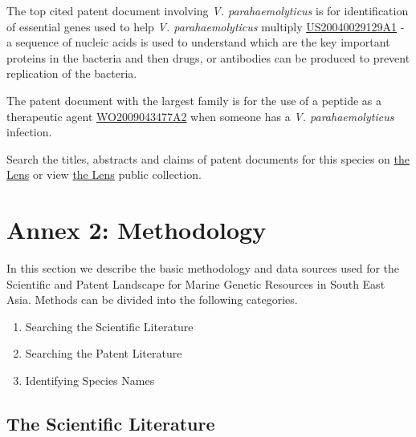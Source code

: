 \documentclass[openany]{book}
\providecommand{\tightlist}{%
  \setlength{\itemsep}{0pt}\setlength{\parskip}{0pt}}
\theoremstyle{definition}
\theoremstyle{definition}
\theoremstyle{definition}
\theoremstyle{remark}
\begin{document}
The top cited patent document involving \emph{V. parahaemolyticus} is
for identification of essential genes used to help \emph{V.
parahaemolyticus} multiply
\href{https://www.lens.org/lens/patent/US_2004_0029129_A1}{US20040029129A1}
- a sequence of nucleic acids is used to understand which are the key
important proteins in the bacteria and then drugs, or antibodies can be
produced to prevent replication of the bacteria.

The patent document with the largest family is for the use of a peptide
as a therapeutic agent
\href{https://www.lens.org/lens/patent/WO_2009_043477_A2}{WO2009043477A2}
when someone has a \emph{V. parahaemolyticus} infection.

Search the titles, abstracts and claims of patent documents for this
species on
\href{https://www.lens.org/lens/search?q=title:(\%22Vibrio\%20parahaemolyticus\%22)\%20OR\%20abstract:(\%22Vibrio\%20parahaemolyticus\%22)\%20OR\%20claims:(\%22Vibrio\%20parahaemolyticus\%22)\&l=en\&preview=true}{the
Lens} or view \href{https://www.lens.org/lens/collection/24760}{the
Lens} public collection.

\hypertarget{method}{%
\chapter{Annex 2: Methodology}\label{method}}

In this section we describe the basic methodology and data sources used
for the Scientific and Patent Landscape for Marine Genetic Resources in
South East Asia. Methods can be divided into the following categories.

\begin{enumerate}
\def\labelenumi{\arabic{enumi}.}
\tightlist
\item
  Searching the Scientific Literature
\item
  Searching the Patent Literature
\item
  Identifying Species Names
\end{enumerate}

\hypertarget{the-scientific-literature}{%
\section{The Scientific Literature}\label{the-scientific-literature}}
\end{document}
